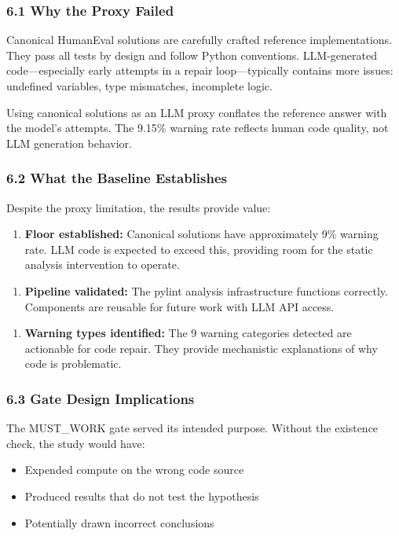 
\subsubsection{6.1 Why the Proxy Failed}

Canonical HumanEval solutions are carefully crafted reference implementations. They pass all tests by design and follow Python conventions. LLM-generated code---especially early attempts in a repair loop---typically contains more issues: undefined variables, type mismatches, incomplete logic.

Using canonical solutions as an LLM proxy conflates the reference answer with the model's attempts. The 9.15\% warning rate reflects human code quality, not LLM generation behavior.

\subsubsection{6.2 What the Baseline Establishes}

Despite the proxy limitation, the results provide value:

\begin{enumerate}
\item \textbf{Floor established:} Canonical solutions have approximately 9\% warning rate. LLM code is expected to exceed this, providing room for the static analysis intervention to operate.
\end{enumerate}

\begin{enumerate}
\item \textbf{Pipeline validated:} The pylint analysis infrastructure functions correctly. Components are reusable for future work with LLM API access.
\end{enumerate}

\begin{enumerate}
\item \textbf{Warning types identified:} The 9 warning categories detected are actionable for code repair. They provide mechanistic explanations of why code is problematic.
\end{enumerate}

\subsubsection{6.3 Gate Design Implications}

The MUST\_WORK gate served its intended purpose. Without the existence check, the study would have:
\begin{itemize}
\item Expended compute on the wrong code source
\item Produced results that do not test the hypothesis
\item Potentially drawn incorrect conclusions
\end{itemize}

